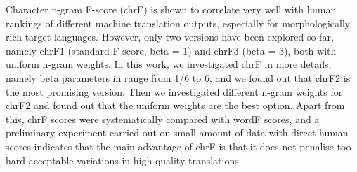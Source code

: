 Character n-gram F-score (chrF) is shown to correlate very well with human rankings of different machine translation outputs, especially for morphologically rich target languages. However, only two versions have been explored so far, namely chrF1 (standard F-score, beta = 1) and chrF3 (beta = 3), both with uniform n-gram weights. In this work, we investigated chrF in more details, namely beta parameters in range from 1/6                    to 6,  and we found out  that chrF2 is the most promising version. Then we investigated different n-gram weights for chrF2 and found out that the uniform weights are the best option. Apart from this, chrF scores were systematically compared with wordF scores, and a preliminary experiment  carried out on small amount of data with direct human scores indicates that the main advantage of chrF is that it does not penalise too hard acceptable variations in high quality translations.
